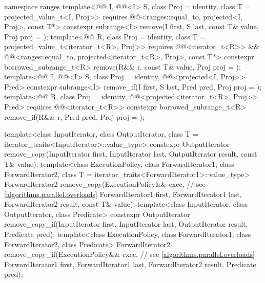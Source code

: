 \begin{codeblock}
{  namespace ranges {
    template<@@ I, @@<I> S, class Proj = identity,
             class T = projected_value_t<I, Proj>>
      requires @@<ranges::equal_to, projected<I, Proj>, const T*>
      constexpr subrange<I> remove(I first, S last, const T& value, Proj proj = {});
    template<@@ R, class Proj = identity,
             class T = projected_value_t<iterator_t<R>, Proj>>
      requires @@<iterator_t<R>> &&
               @@<ranges::equal_to,
                                         projected<iterator_t<R>, Proj>, const T*>
      constexpr borrowed_subrange_t<R>
        remove(R&& r, const T& value, Proj proj = {});
    template<@@ I, @@<I> S, class Proj = identity,
             @@<projected<I, Proj>> Pred>
      constexpr subrange<I> remove_if(I first, S last, Pred pred, Proj proj = {});
    template<@@ R, class Proj = identity,
             @@<projected<iterator_t<R>, Proj>> Pred>
      requires @@<iterator_t<R>>
      constexpr borrowed_subrange_t<R>
        remove_if(R&& r, Pred pred, Proj proj = {});
  }

  template<class InputIterator, class OutputIterator,
           class T = iterator_traits<InputIterator>::value_type>
    constexpr OutputIterator
      remove_copy(InputIterator first, InputIterator last,
                  OutputIterator result, const T& value);
  template<class ExecutionPolicy, class ForwardIterator1, class ForwardIterator2,
           class T = iterator_traits<ForwardIterator1>::value_type>
    ForwardIterator2
      remove_copy(ExecutionPolicy&& exec,                       // see \ref{algorithms.parallel.overloads}
                  ForwardIterator1 first, ForwardIterator1 last,
                  ForwardIterator2 result, const T& value);
  template<class InputIterator, class OutputIterator, class Predicate>
    constexpr OutputIterator
      remove_copy_if(InputIterator first, InputIterator last,
                     OutputIterator result, Predicate pred);
  template<class ExecutionPolicy, class ForwardIterator1, class ForwardIterator2,
           class Predicate>
    ForwardIterator2
      remove_copy_if(ExecutionPolicy&& exec,                    // see \ref{algorithms.parallel.overloads}
                     ForwardIterator1 first, ForwardIterator1 last,
                     ForwardIterator2 result, Predicate pred);

}
\end{codeblock}
